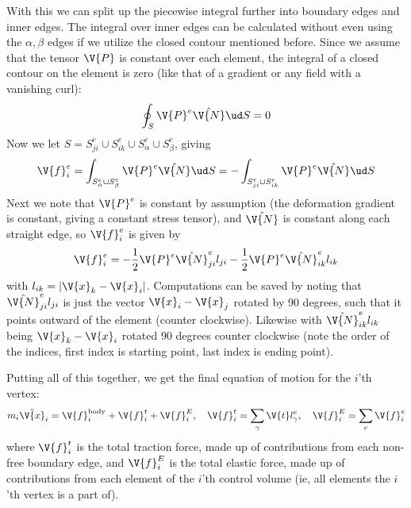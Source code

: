 \documentclass[sigconf]{acmart}
\begin{document}
With this we can split up the piecewise integral further into boundary edges and inner edges. The integral over inner edges can be calculated without even using the $ \alpha, \beta $ edges if we utilize the closed contour mentioned before. Since we assume that the tensor $ \V{P} $ is constant over each element, the integral of a closed contour on the element is zero (like that of a gradient or any field with a vanishing curl):
\begin{equation}\label{eq:integration}
	\oint_S \V{P}^e\hat{\V{N}} \ud S = 0
\end{equation}
Now we let $ S = S^e_{ji} \cup S^e_{ik} \cup S^e_{\alpha} \cup S^e_{\beta} $, giving
\begin{equation}\label{key}
	\V{f}^e_i = \int_{S^e_{\alpha} \cup S^e_{\beta}} \V{P}^e\hat{\V{N}} \ud S = -\int_{S^e_{ji} \cup S^e_{ik}} \V{P}^e\hat{\V{N}} \ud S
\end{equation}
Next we note that $ \V{P}^e $ is constant by assumption (the deformation gradient is constant, giving a constant stress tensor), and $ \hat{\V{N}} $ is constant along each straight edge, so $ \V{f}^e_i $ is given by
\begin{equation}\label{key}
\V{f}^e_i = -\frac{1}{2} \V{P}^e \hat{\V{N}}^e_{ji}l_{ji} - \frac{1}{2} \V{P}^e\hat{\V{N}}^e_{ik}l_{ik}
\end{equation}
with $ l_{ik} = |\V{x}_k - \V{x}_i|$. Computations can be saved by noting that $ \hat{\V{N}}^e_{ji} l_{ji} $ is just the vector $ \V{x}_i-\V{x}_j $ rotated by 90 degrees, such that it points outward of the element (counter clockwise). Likewise with $ \hat{\V{N}}^e_{ik} l_{ik} $ being $ \V{x}_k -\V{x}_i$ rotated 90 degrees counter clockwise (note the order of the indices, first index is starting point, last index is ending point).

Putting all of this together, we get the final equation of motion for the $ i $'th vertex:
\begin{equation}\label{key}
	m_i \ddot{\V{x}}_i = \V{f}_i^{\text{body}} + \V{f}_i^t +\V{f}^E_i, \quad \V{f}^t_i = \sum_{\gamma}   \V{t}l^e_{\gamma}, \quad \V{f}^E_i = \sum_e \V{f}^e_i
\end{equation}
where $ \V{f}^t_i $ is the total traction force, made up of contributions from each non-free boundary edge, and $ \V{f}^E_i $ is the total elastic force, made up of contributions from each element of the $ i $'th control volume (ie, all elements the $ i $'th vertex is a part of).
\end{document}
